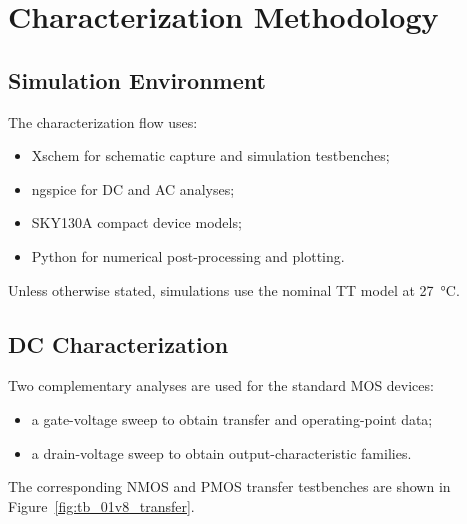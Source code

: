 
\section{Characterization Methodology}
\label{sec:characterization_methodology}



\subsection{Simulation Environment}

The characterization flow uses:

\begin{itemize}
	\item Xschem for schematic capture and simulation testbenches;
	\item ngspice for DC and AC analyses;
	\item SKY130A compact device models;
	\item Python for numerical post-processing and plotting.
\end{itemize}

Unless otherwise stated, simulations use the nominal TT model at
\qty{27}{\degreeCelsius}.



\subsection{DC Characterization}

Two complementary analyses are used for the standard MOS devices:

\begin{itemize}
	\item a gate-voltage sweep to obtain transfer and operating-point
	data;
	\item a drain-voltage sweep to obtain output-characteristic
	families.
\end{itemize}

The corresponding NMOS and PMOS transfer testbenches are shown in
Figure~\ref{fig:tb_01v8_transfer}.

